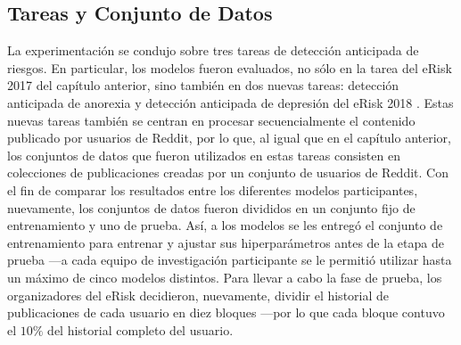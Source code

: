 \subsection{Tareas y Conjunto de Datos}

La experimentación se condujo sobre tres tareas de detección anticipada de riesgos.
En particular, los modelos fueron evaluados, no sólo en la tarea del eRisk 2017 \cite{losada2017erisk} del capítulo anterior, sino también en dos nuevas tareas: detección anticipada de anorexia y detección anticipada de depresión del eRisk 2018 \cite{losada2018overview}.
Estas nuevas tareas también se centran en procesar secuencialmente el contenido publicado por usuarios de Reddit,
por lo que, al igual que en el capítulo anterior, los conjuntos de datos que fueron utilizados en estas tareas consisten en colecciones de publicaciones creadas por un conjunto de usuarios de Reddit. %
Con el fin de comparar los resultados entre los diferentes modelos participantes, nuevamente, los conjuntos de datos fueron divididos en un conjunto fijo de entrenamiento y uno de prueba.
Así, a los modelos se les entregó el conjunto de entrenamiento para entrenar y ajustar sus hiperparámetros antes de la etapa de prueba ---a cada equipo de investigación participante se le permitió utilizar hasta un máximo de cinco modelos distintos.
Para llevar a cabo la fase de prueba, los organizadores del eRisk decidieron, nuevamente, dividir el historial de publicaciones de cada usuario en diez bloques ---por lo que cada bloque contuvo el $10\%$ del historial completo del usuario.
